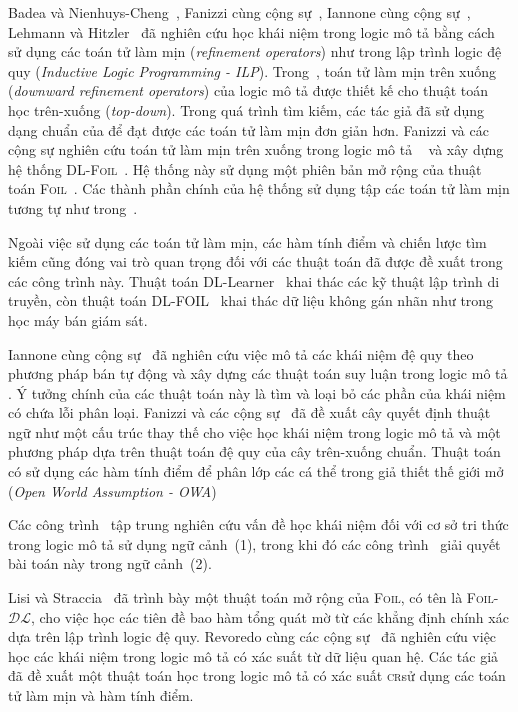 Badea và Nienhuys-Cheng~\cite{Badea2000}, Fanizzi cùng cộng sự~\cite{Fanizzi2004,Fanizzi2008}, Iannone cùng cộng sự~\cite{Iannone2007}, Lehmann và Hitzler~\cite{Lehmann2007,Lehmann2010} đã nghiên cứu học khái niệm trong logic mô tả bằng cách sử dụng các toán tử làm mịn ({\em refinement operators}) như trong lập trình logic đệ quy ({\em Inductive Logic Programming - ILP}).
%
Trong~\cite{Badea2000}, toán tử làm mịn trên xuống ({\em downward refinement operators}) của logic mô tả \ALER được thiết kế cho thuật toán học trên-xuống ({\em top-down}). Trong quá trình tìm kiếm, các tác giả đã sử dụng dạng chuẩn của \ALER để đạt được các toán tử làm mịn đơn giản hơn.
%
Fanizzi và các cộng sự nghiên cứu toán tử làm mịn trên xuống trong logic mô tả \ALN~\cite{Fanizzi2004} và xây dựng hệ thống \textsc{DL-Foil}~\cite{Fanizzi2008}. Hệ thống này sử dụng một phiên bản mở rộng của thuật toán \textsc{Foil}~\cite{Quinlan1990}. Các thành phần chính của hệ thống sử dụng tập các toán tử làm mịn tương tự như trong~\cite{Badea2000}.
%

Ngoài việc sử dụng các toán tử làm mịn, các hàm tính điểm và chiến lược tìm kiếm cũng đóng vai trò quan trọng đối với các thuật toán đã được đề xuất trong các công trình này. Thuật toán DL-Learner~\cite{Lehmann2010} khai thác các kỹ thuật lập trình di truyền, còn thuật toán DL-FOIL~\cite{Fanizzi2008} khai thác dữ liệu không gán nhãn như trong học máy bán giám sát.
%

Iannone cùng cộng sự~\cite{Iannone2007} đã nghiên cứu việc mô tả các khái niệm đệ quy theo phương pháp bán tự động và xây dựng các thuật toán suy luận trong logic mô tả \ALC. Ý tưởng chính của các thuật toán này là tìm và loại bỏ các phần của khái niệm có chứa lỗi phân loại.
%
Fanizzi và các cộng sự~\cite{Fanizzi2010} đã đề xuất cây quyết định thuật ngữ như một cấu trúc thay thế cho việc học khái niệm trong logic mô tả và một phương pháp dựa trên thuật toán đệ quy của cây trên-xuống chuẩn. Thuật toán có sử dụng các hàm tính điểm để phân lớp các cá thể trong giả thiết thế giới mở ({\em Open World Assumption - OWA})

Các công trình~\cite{Badea2000,Iannone2007} tập trung nghiên cứu vấn đề học khái niệm đối với cơ sở tri thức trong logic mô tả sử dụng ngữ cảnh~(1), trong khi đó các công trình~\cite{Fanizzi2004,Fanizzi2008,Lehmann2007,Lehmann2010} giải quyết bài toán này trong ngữ cảnh~(2).

Lisi và Straccia~\cite{Lisi2013} đã trình bày một thuật toán mở rộng của \textsc{Foil}, có tên là \textsc{Foil-}$\mathcal{DL}$, cho việc học các tiên đề bao hàm tổng quát mờ từ các khẳng định chính xác dựa trên lập trình logic đệ quy. Revoredo cùng các cộng sự~\cite{Revoredo2010} đã nghiên cứu việc học các khái niệm trong logic mô tả có xác suất từ dữ liệu quan hệ. Các tác giả đã đề xuất một thuật toán học trong logic mô tả có xác suất \textsc{cr}\ALC sử dụng các toán tử làm mịn và hàm tính điểm.

